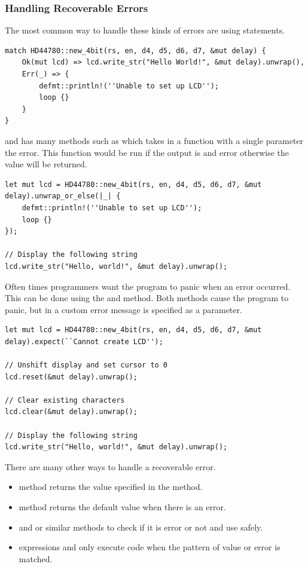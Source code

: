 \documentclass{beamer}
\begin{document}
\begin{frame}
  \frametitle[]{Handling Recoverable Errors}
  The most common way to handle these kinds of errors are using  statements.

\begin{lstlisting}
match HD44780::new_4bit(rs, en, d4, d5, d6, d7, &mut delay) {
    Ok(mut lcd) => lcd.write_str("Hello World!", &mut delay).unwrap(),
    Err(_) => {
        defmt::println!(''Unable to set up LCD'');
        loop {}
    }
}
\end{lstlisting}

\pagebreak

 and  has many methods such as  which takes in a function with a single parameter the error. This function would be run if the output is and error otherwise the value  will be returned.

\begin{lstlisting}
let mut lcd = HD44780::new_4bit(rs, en, d4, d5, d6, d7, &mut delay).unwrap_or_else(|_| {
    defmt::println!(''Unable to set up LCD'');
    loop {}
});

// Display the following string
lcd.write_str("Hello, world!", &mut delay).unwrap();
\end{lstlisting}

\pagebreak

Often times programmers want the program to panic when an error occurred. This can be done using the  and  method. Both methods cause the program to panic, but in  a custom error message is specified as a parameter.

\begin{lstlisting}
let mut lcd = HD44780::new_4bit(rs, en, d4, d5, d6, d7, &mut delay).expect(``Cannot create LCD'');

// Unshift display and set cursor to 0
lcd.reset(&mut delay).unwrap();

// Clear existing characters
lcd.clear(&mut delay).unwrap();

// Display the following string
lcd.write_str("Hello, world!", &mut delay).unwrap();
\end{lstlisting}

\pagebreak

There are many other ways to handle a recoverable error.
\begin{itemize}
  \item{ method returns the value specified in the method.}
  \item{ method returns the default value when there is an error.}
  \item{ and  or similar methods to check if it is error or not and use  safely.}
  \item{ expressions and only execute code when the pattern of value or error is matched.}
\end{itemize}
\end{frame}
\end{document}

